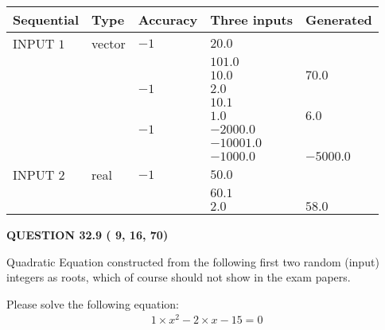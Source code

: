 \documentclass[12pt]{article}
\begin{document}
  
\noindent\begin{tabular}{|l|l|l|l|l|}
\hline
 Sequential & Type & Accuracy & Three inputs & Generated \\ 
\hline
 
 
  INPUT $           1$ & vector & $          -1 $ & $
20.0
  $ & \\
  & & & $
101.0
  $ & \\
  & & & $
10.0
$ & $ 70.0 $ 
  \\
  & & $          -1 $ & $
2.0
  $ & \\
  & & & $
10.1
  $ & \\
  & & & $
1.0
$ & $ 6.0 $ 
  \\
  & & $          -1 $ & $
-2000.0
  $ & \\
  & & & $
-10001.0
  $ & \\
  & & & $
-1000.0
$ & $ -5000.0 $ 
 \\  \hline  
 
 
  INPUT $           2$ & real & $          -1 $ & $
 50.0
  $ & \\
  & & &  $
 60.1
  $ & \\
  & & &  $
 2.0
 $ & $ 58.0 $ 
 \\  \hline  
 \end{tabular}
   
   
  
\vspace{0.2in}
  
{\textbf{\Large{QUESTION
32.9 
 (          9,         16,         70)
}}}
  
  


\noindent{}
Quadratic Equation constructed from the following first two random (input) integers as roots,  
which of course should not show in the exam papers.  
\noindent{}


 
 

 
Please solve the following equation:
\begin{eqnarray*}
1 \times x^2  %
-2
                 \times x    %
-15 =0
\end{eqnarray*}
 
 
 
\noindent{}
 
 
\end{document}

